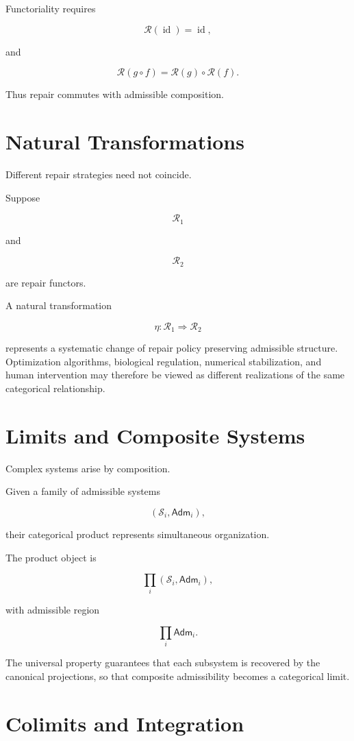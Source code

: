 \documentclass[11pt,oneside]{book}
\numberwithin{equation}{chapter}
\theoremstyle{definition}
\theoremstyle{plain}
\DeclareMathOperator{\id}{id}
\newcommand{\State}{\mathcal{S}}
\newcommand{\Adm}{\mathsf{Adm}}
\begin{document}
Functoriality requires

\[
\mathcal R(\id)
=
\id,
\]

and

\[
\mathcal R(g\circ f)
=
\mathcal R(g)
\circ
\mathcal R(f).
\]

Thus repair commutes with admissible composition.

\section{Natural Transformations}

Different repair strategies need not coincide.

Suppose

\[
\mathcal R_1
\]

and

\[
\mathcal R_2
\]

are repair functors.

A natural transformation

\[
\eta:
\mathcal R_1
\Rightarrow
\mathcal R_2
\]

represents a systematic change of repair policy preserving admissible structure. Optimization algorithms, biological regulation, numerical stabilization, and human intervention may therefore be viewed as different realizations of the same categorical relationship.

\section{Limits and Composite Systems}

Complex systems arise by composition.

Given a family of admissible systems

\[
(\State_i,\Adm_i),
\]

their categorical product represents simultaneous organization.

The product object is

\[
\prod_i
(\State_i,\Adm_i),
\]

with admissible region

\[
\prod_i
\Adm_i.
\]

The universal property guarantees that each subsystem is recovered by the canonical projections, so that composite admissibility becomes a categorical limit.

\section{Colimits and Integration}
\end{document}
